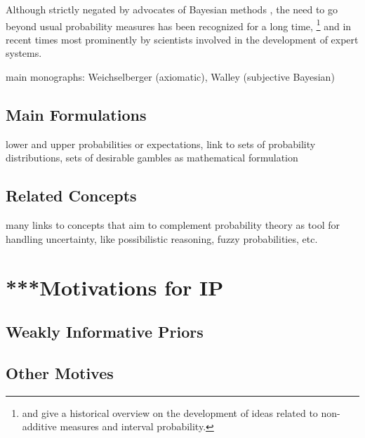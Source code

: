 Although strictly negated by advocates of Bayesian methods \parencite[e.g., by][]{1987:lindley},
the need to go beyond usual probability measures has been recognized for a long time,%
\footnote{\textcite{2009:hampel} and \textcite[Section~1]{2001:weichselberger} give a historical overview on the development of
ideas related to non-additive measures and interval probability.}
and in recent times most prominently by scientists involved in the development of expert systems.


main monographs: Weichselberger (axiomatic), Walley (subjective Bayesian)

\subsection{Main Formulations}
\label{sec:ip-main}

lower and upper probabilities or expectations,
link to sets of probability distributions,
sets of desirable gambles as mathematical formulation


\subsection{Related Concepts}

many links to concepts that aim to complement probability theory as tool for handling uncertainty,
like possibilistic reasoning, fuzzy probabilities, etc.


\section{***Motivations for IP}

\subsection{\pdc }

\subsection{Weakly Informative Priors}


\subsection{Other Motives}

